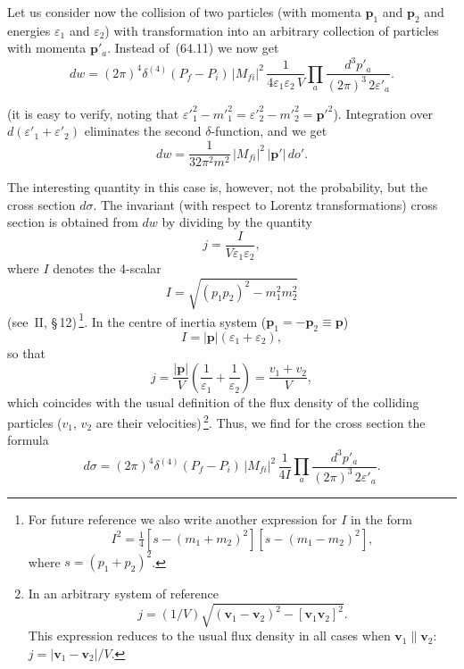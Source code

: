 Let us consider now the collision of two particles (with momenta $\mathbf{p}_1$ and $\mathbf{p}_2$ and energies $\varepsilon_1$ and $\varepsilon_2$) with transformation into an arbitrary collection of particles with momenta $\mathbf{p}'_a$. Instead of~(64.11) we now get
\begin{equation}
dw = (2\pi)^4\delta^{(4)}(P_f - P_i)\,|M_{fi}|^2\,\frac{1}{4\varepsilon_1\varepsilon_2\,V}\prod_a\frac{d^3p'_a}{(2\pi)^3\,2\varepsilon'_a}.
\tag{64.14}
\end{equation}

(it is easy to verify, noting that $\varepsilon'^2_1 - m'^2_1 = \varepsilon'^2_2 - m'^2_2 = \mathbf{p}'^2$). Integration over $d(\varepsilon'_1 + \varepsilon'_2)$ eliminates the second $\delta$-function, and we get
\[
dw = \frac{1}{32\pi^2 m^2}\,|M_{fi}|^2\,|\mathbf{p}'|\,do'.
\]

The interesting quantity in this case is, however, not the probability, but the cross section $d\sigma$. The invariant (with respect to Lorentz transformations) cross section is obtained from $dw$ by dividing by the quantity
\begin{equation}
j = \frac{I}{V\varepsilon_1\varepsilon_2},
\tag{64.14}
\end{equation}
where $I$ denotes the 4-scalar
\begin{equation}
I = \sqrt{(p_1 p_2)^2 - m^2_1 m^2_2}
\tag{64.15}
\end{equation}
(see~II, \S\,12)\,\footnote{For future reference we also write another expression for $I$ in the form
\begin{equation}
I^2 = \tfrac{1}{4}[s - (m_1 + m_2)^2][s - (m_1 - m_2)^2],
\tag{64.15a}
\end{equation}
where $s = (p_1 + p_2)^2$.}. In the centre of inertia system ($\mathbf{p}_1 = -\mathbf{p}_2 \equiv \mathbf{p}$)
\begin{equation}
I = |\mathbf{p}|(\varepsilon_1 + \varepsilon_2),
\tag{64.16}
\end{equation}
so that
\begin{equation}
j = \frac{|\mathbf{p}|}{V}\left(\frac{1}{\varepsilon_1} + \frac{1}{\varepsilon_2}\right) = \frac{v_1 + v_2}{V},
\tag{64.17}
\end{equation}
which coincides with the usual definition of the flux density of the colliding particles ($v_1$, $v_2$ are their velocities)\,\footnote{In an arbitrary system of reference
\[
j = (1/V)\sqrt{(\mathbf{v}_1 - \mathbf{v}_2)^2 - [\mathbf{v}_1\mathbf{v}_2]^2}.
\]
This expression reduces to the usual flux density in all cases when $\mathbf{v}_1 \| \mathbf{v}_2$: $j = |\mathbf{v}_1 - \mathbf{v}_2|/V$.}. Thus, we find for the cross section the formula
\begin{equation}
d\sigma = (2\pi)^4\delta^{(4)}(P_f - P_i)\,|M_{fi}|^2\,\frac{1}{4I}\prod_a\frac{d^3p'_a}{(2\pi)^3\,2\varepsilon'_a}.
\tag{64.18}
\end{equation}


